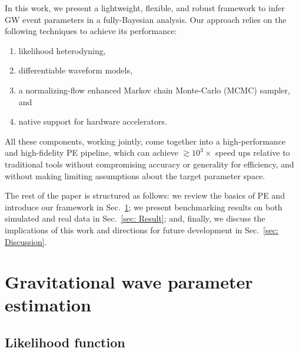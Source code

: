 \documentclass[twocolumn]{aastex631}
\begin{document}

In this work, we present a lightweight, flexible, and robust
framework to infer GW event parameters in a fully-Bayesian analysis. Our
approach relies on the following techniques to achieve its performance:
\begin{enumerate}
\setlength{\itemsep}{0pt}
\item likelihood heterodyning,
\item differentiable waveform models,
\item a normalizing-flow enhanced Markov chain Monte-Carlo (MCMC) sampler, and
\item native support for hardware accelerators.
\end{enumerate}
All these components, working jointly, come together into a high-performance
and high-fidelity PE pipeline, which can achieve ${\gtrsim}10^3\times$ speed
ups relative to traditional tools without compromising accuracy or generality
for efficiency, and without making limiting assumptions about the target
parameter space.

The rest of the paper is structured as follows: we review the basics of PE and
introduce our framework in Sec.~\ref{sec: PE}; we present benchmarking results
on both simulated and real data in Sec.~\ref{sec: Result}; and, finally, we
discuss the implications of this work and directions for future development in
Sec.~\ref{sec: Discussion}.

\section{Gravitational wave parameter estimation}
\label{sec: PE}

\subsection{Likelihood function}
\label{sec:likelihood}
\end{document}

